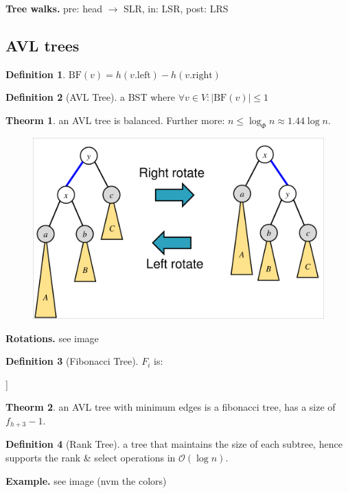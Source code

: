 \documentclass[]{article}
\newcommand\compactsubsection[1]        {\vspace{-10pt}\subsection{#1}\vspace{-6pt}}
\theoremstyle{definition}
\newtheorem{Theorem}{\color{theoColor}Theorm}
\newtheorem{Definition}{\color{defiColor}Definition}
\newcommand\theo  [1] {\begin{Theorem}#1\end{Theorem}}
\newcommand\defi  [1] {\begin{Definition}#1\end{Definition}}
\newcommand\oc    {\mathcal{O}}
\newcommand\co        {\colon}
\newcommand\logn      {\log n}
\newcommand\sof[1]    {\left | #1 \right |}
\begin{document}
\begin{multicols}{4}
				\textbf{Tree walks. }pre: head $\to$ SLR, in: LSR, post: LRS
				
				
			\compactsubsection{AVL trees}
				\defi{$\mathrm{BF}(v) = h(v.\mathrm{left}) - h(v.\mathrm{right})$}
				\begin{Definition}[AVL Tree]
					a BST where $\forall v \in V \co \sof{\mathrm{BF}(v)} \le 1$
				\end{Definition}
				\theo{an AVL tree is balanced. Further more: $n \le \log_{\Phi}n \approx 1.44\logn$. }
				
				\begin{figure}
					\includegraphics[width=\linewidth]{images/rotations}
					\vspace{-20pt}
				\end{figure}
				\textbf{Rotations. }see image
				\begin{Definition}[Fibonacci Tree]
					$F_i$ is: \\ \vspace{3pt} \begin{center}
						\begin{forest}
							[$F_i$ [$F_{i -1}$] [$F_{i - 2}$]]
						\end{forest}
					\end{center}
				\end{Definition}\vspace{2pt}
				\theo{an AVL tree with minimum edges is a fibonacci tree, has a size of $f_{h + 3} - 1$. }
				\begin{Definition}[Rank Tree]
					a tree that maintains the size of each subtree, hence supports the rank \& select operations in $\oc(\logn)$. 
				\end{Definition}
				\textbf{Example. }see image (nvm the colors)

\end{multicols}
\end{document}
